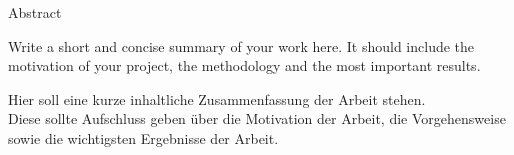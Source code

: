 

\begin{center} {\LARGE Abstract} \end{center}

Write a short and concise summary of your work here. It should include the motivation of your project, the methodology and the most important results.

\vspace{2cm}

\begin{otherlanguage}{ngerman}
Hier soll eine kurze inhaltliche Zusammenfassung der Arbeit stehen. \\
Diese sollte Aufschluss geben \"uber die Motivation der Arbeit, die Vorgehensweise sowie die wichtigsten Ergebnisse der Arbeit.
\end{otherlanguage}

\cleardoublepage
